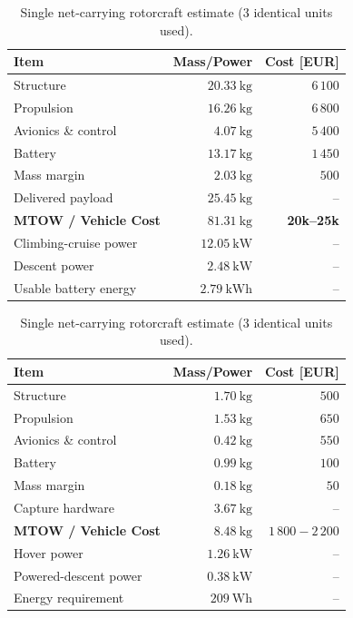 \begin{table}[H]
\centering
\footnotesize %
\setlength{\tabcolsep}{3.5pt} %

\begin{minipage}[t]{0.48\textwidth}
\centering
\caption{Hybrid carrier mass, power and cost estimate.}
\label{tab:conceptB_carrier_compact}
\begin{tabular}{lrr}
\hline
\textbf{Item} & \textbf{Mass/Power} & \textbf{Cost [EUR]} \\
\hline
Structure & $20.33~\mathrm{kg}$ & $6\,100$ \\
Propulsion & $16.26~\mathrm{kg}$ & $6\,800$ \\
Avionics \& control & $4.07~\mathrm{kg}$ & $5\,400$ \\
Battery & $13.17~\mathrm{kg}$ & $1\,450$ \\
Mass margin & $2.03~\mathrm{kg}$ & $500$ \\
Delivered payload & $25.45~\mathrm{kg}$ & -- \\
\hline
\textbf{MTOW / Vehicle Cost} & \textbf{$81.31~\mathrm{kg}$} & \textbf{20k--25k} \\
\hline
Climbing-cruise power & $12.05~\mathrm{kW}$ & -- \\
Descent power & $2.48~\mathrm{kW}$ & -- \\
Usable battery energy & $2.79~\mathrm{kWh}$ & -- \\
\hline
\end{tabular}
\end{minipage}
\hfill %
\begin{minipage}[t]{0.48\textwidth}
\centering
\caption{Single net-carrying rotorcraft estimate (3 identical units used).}
\label{tab:conceptB_rotorcraft_compact}
\begin{tabular}{lrr}
\hline
\textbf{Item} & \textbf{Mass/Power} & \textbf{Cost [EUR]} \\
\hline
Structure & $1.70~\mathrm{kg}$ & $500$ \\
Propulsion & $1.53~\mathrm{kg}$ & $650$ \\
Avionics \& control & $0.42~\mathrm{kg}$ & $550$ \\
Battery & $0.99~\mathrm{kg}$ & $100$ \\
Mass margin & $0.18~\mathrm{kg}$ & $50$ \\
Capture hardware & $3.67~\mathrm{kg}$ & -- \\
\hline
\textbf{MTOW / Vehicle Cost} & \textbf{$8.48~\mathrm{kg}$} & \textbf{$1\,800-2\,200$} \\
\hline
Hover power & $1.26~\mathrm{kW}$ & -- \\
Powered-descent power & $0.38~\mathrm{kW}$ & -- \\
Energy requirement & $209~\mathrm{Wh}$ & -- \\
\hline
\end{tabular}
\end{minipage}
\end{table}




